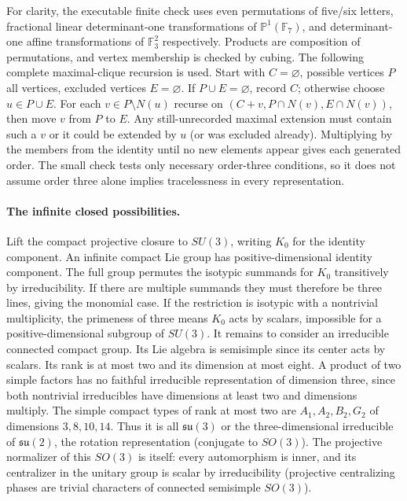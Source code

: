 \documentclass[10pt]{article}
\begin{document}
For clarity, the executable finite check uses even permutations of five/six letters, fractional linear determinant-one transformations of $\mathbb P^1(\mathbb F_7)$, and determinant-one affine transformations of $\mathbb F_3^2$ respectively. Products are composition of permutations, and vertex membership is checked by cubing. The following complete maximal-clique recursion is used. Start with $C=\varnothing$, possible vertices $P$ all vertices, excluded vertices $E=\varnothing$. If $P\cup E=\varnothing$, record $C$; otherwise choose $u\in P\cup E$. For each $v\in P\setminus N(u)$ recurse on $(C+v,P\cap N(v),E\cap N(v))$, then move $v$ from $P$ to $E$. Any still-unrecorded maximal extension must contain such a $v$ or it could be extended by $u$ (or was excluded already). Multiplying by the members from the identity until no new elements appear gives each generated order. The small check tests only necessary order-three conditions, so it does not assume order three alone implies tracelessness in every representation.

\paragraph{The infinite closed possibilities.}
Lift the compact projective closure to $SU(3)$, writing $K_0$ for the identity component. An infinite compact Lie group has positive-dimensional identity component. The full group permutes the isotypic summands for $K_0$ transitively by irreducibility. If there are multiple summands they must therefore be three lines, giving the monomial case. If the restriction is isotypic with a nontrivial multiplicity, the primeness of three means $K_0$ acts by scalars, impossible for a positive-dimensional subgroup of $SU(3)$. It remains to consider an irreducible connected compact group. Its Lie algebra is semisimple since its center acts by scalars. Its rank is at most two and its dimension at most eight. A product of two simple factors has no faithful irreducible representation of dimension three, since both nontrivial irreducibles have dimensions at least two and dimensions multiply. The simple compact types of rank at most two are $A_1,A_2,B_2,G_2$ of dimensions $3,8,10,14$. Thus it is all $\mathfrak{su}(3)$ or the three-dimensional irreducible of $\mathfrak{su}(2)$, the rotation representation (conjugate to $SO(3)$). The projective normalizer of this $SO(3)$ is itself: every automorphism is inner, and its centralizer in the unitary group is scalar by irreducibility (projective centralizing phases are trivial characters of connected semisimple $SO(3)$).
\end{document}
